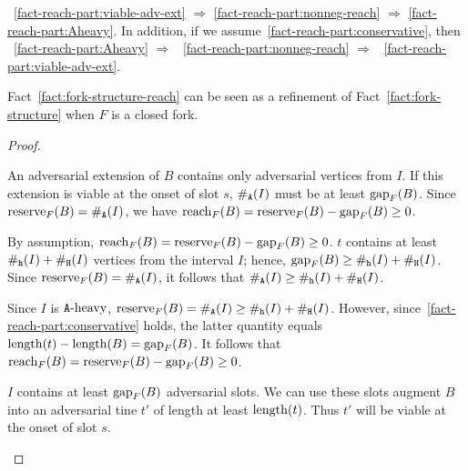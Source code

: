 \begin{fact}\label{fact:fork-structure-reach}
    ~\ref{fact-reach-part:viable-adv-ext} $\Longrightarrow$
    \ref{fact-reach-part:nonneg-reach} $\Longrightarrow$
    \ref{fact-reach-part:Aheavy}.
    In addition, if we assume~\ref{fact-reach-part:conservative}, then 
    ~\ref{fact-reach-part:Aheavy} $\Longrightarrow$ 
    ~\ref{fact-reach-part:nonneg-reach} $\Longrightarrow$
    ~\ref{fact-reach-part:viable-adv-ext}.
\end{fact}
Fact~\ref{fact:fork-structure-reach} can be seen as 
a refinement of Fact~\ref{fact:fork-structure} 
when $F$ is a closed fork. 
\begin{proof}~
  \begin{description}[font=\normalfont\itshape\space]
    \item[\ref{fact-reach-part:viable-adv-ext} implies~\ref{fact-reach-part:nonneg-reach}.]
      An adversarial extension of $B$ 
      contains only adversarial vertices from $I$. 
      If this extension is viable at the onset of slot $s$, 
      $\#_{\mathtt{A}}(I)$ must be at least $\operatorname{gap}_{F}(B)$.
      Since $\operatorname{reserve}_{F}(B) = \#_{\mathtt{A}}(I)$, we have 
      $\operatorname{reach}_{F}(B) = \operatorname{reserve}_{F}(B) - \operatorname{gap}_{F}(B) \geq 0$.  
      
    \item[\ref{fact-reach-part:nonneg-reach} implies~\ref{fact-reach-part:Aheavy}.]
      By assumption, $\operatorname{reach}_{F}(B)  = \operatorname{reserve}_{F}(B) - \operatorname{gap}_{F}(B) \geq 0$.               
      $t$ contains at least $\#_{\mathtt{h}}(I) + \#_{\mathtt{H}}(I)$ vertices from 
      the interval $I$; 
      hence, $\operatorname{gap}_{F}(B) \geq \#_{\mathtt{h}}(I) + \#_{\mathtt{H}}(I)$. 
      Since $\operatorname{reserve}_{F}(B) = \#_{\mathtt{A}}(I)$, 
      it follows that $\#_{\mathtt{A}}(I) \geq \#_{\mathtt{h}}(I) + \#_{\mathtt{H}}(I)$. 

    \item[\ref{fact-reach-part:conservative} and~\ref{fact-reach-part:Aheavy} implies~\ref{fact-reach-part:nonneg-reach}.]
      Since $I$ is $\mathtt{A}\text{-heavy}$, 
      $\operatorname{reserve}_F(B) = \#_{\mathtt{A}}(I) \geq \#_{\mathtt{h}}(I) + \#_{\mathtt{H}}(I)$. 
      However, since~\ref{fact-reach-part:conservative} holds, 
      the latter quantity equals $\operatorname{length}(t) - \operatorname{length}(B) = \operatorname{gap}_F(B)$. 
      It follows that $\operatorname{reach}_F(B) = \operatorname{reserve}_F(B) - \operatorname{gap}_F(B) \geq 0$. 

    \item[\ref{fact-reach-part:conservative} and~\ref{fact-reach-part:nonneg-reach} implies~\ref{fact-reach-part:viable-adv-ext}.]
      $I$ contains at least $\operatorname{gap}_F(B)$ adversarial slots. 
      We can use these slots augment $B$ 
      into an adversarial tine $t'$ 
      of length at least $\operatorname{length}(t)$. 
      Thus $t'$ will be viable at the onset of slot $s$.
  \end{description}  
\end{proof}



